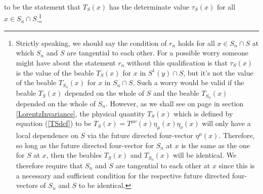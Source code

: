 \documentclass[12pt]{report}
\begin{document}
%
to be the statement that  $T_S(x)$ has the determinate value $\tau_S(x)$ for all $x\in S_n\cap S$.\footnote{\label{tangentialnote}Strictly speaking, we should say the condition of $r_n$ holds for all $x\in S_n\cap S$ at which $S_n$ and $S$ are tangential to each other. For a possible worry someone might have about the statement $r_n$ without this qualification is that $\tau_S(x)$ is the value of the beable $T_S(x)$ for $x$ in $S^1(y)\cap S$, but it's not the value of the beable $T_{S_n}(x)$ for $x$ in $S_n\cap S$. Such a worry would be valid if the beable $T_S(x)$ depended on the whole of $S$ and the beable $T_{S_n}(x)$ depended on the whole of $S_n$. However, as we shall see on page \pageref{localdependenceS} in section \ref{LorentzInvariance}, the physical quantity $T_S(x)$ which is defined by equation (\ref{TSdef}) to be $T_S(x)=T^{\mu\nu}(x)\eta_{\mu}(x)\eta_{\nu}(x)$ will only have a local dependence on $S$ via the future directed four-vector $\eta^\mu(x)$. Therefore, so long as the future directed four-vector for $S_n$ at $x$ is the same as the one for $S$ at $x$, then the beables $T_{S}(x)$ and  $T_{S_n}(x)$ will be identical. We therefore require that $S_n$ and $S$ are tangential to each other at $x$ since this is a necessary and sufficient condition for the respective future directed four-vectors of $S_n$ and $S$ to be identical.
\newline
\newline
}
\end{document}
